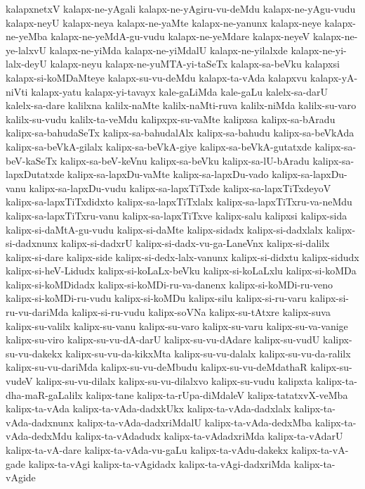 {kalapxnetxV
kalapx-ne-yAgali
kalapx-ne-yAgiru-vu-deMdu
kalapx-ne-yAgu-vudu
kalapx-neyU
kalapx-neya
kalapx-ne-yaMte
kalapx-ne-yanunx
kalapx-neye
kalapx-ne-yeMba
kalapx-ne-yeMdA-gu-vudu
kalapx-ne-yeMdare
kalapx-neyeV
kalapx-ne-ye-lalxvU
kalapx-ne-yiMda
kalapx-ne-yiMdalU
kalapx-ne-yilalxde
kalapx-ne-yi-lalx-deyU
kalapx-neyu
kalapx-ne-yuMTA-yi-taSeTx
kalapx-sa-beVku
kalapxsi
kalapx-si-koMDaMteye
kalapx-su-vu-deMdu
kalapx-ta-vAda
kalapxvu
kalapx-yA-niVti
kalapx-yatu
kalapx-yi-tavayx
kale-gaLiMda
kale-gaLu
kalelx-sa-darU
kalelx-sa-dare
kalilxna
kalilx-naMte
kalilx-naMti-ruva
kalilx-niMda
kalilx-su-varo
kalilx-su-vudu
kalilx-ta-veMdu
kalipxpx-su-vaMte
kalipxsa
kalipx-sa-bAradu
kalipx-sa-bahudaSeTx
kalipx-sa-bahudalAlx
kalipx-sa-bahudu
kalipx-sa-beVkAda
kalipx-sa-beVkA-gilalx
kalipx-sa-beVkA-giye
kalipx-sa-beVkA-gutatxde
kalipx-sa-beV-kaSeTx
kalipx-sa-beV-keVnu
kalipx-sa-beVku
kalipx-sa-lU-bAradu
kalipx-sa-lapxDutatxde
kalipx-sa-lapxDu-vaMte
kalipx-sa-lapxDu-vado
kalipx-sa-lapxDu-vanu
kalipx-sa-lapxDu-vudu
kalipx-sa-lapxTiTxde
kalipx-sa-lapxTiTxdeyoV
kalipx-sa-lapxTiTxdidxto
kalipx-sa-lapxTiTxlalx
kalipx-sa-lapxTiTxru-va-neMdu
kalipx-sa-lapxTiTxru-vanu
kalipx-sa-lapxTiTxve
kalipx-salu
kalipxsi
kalipx-sida
kalipx-si-daMtA-gu-vudu
kalipx-si-daMte
kalipx-sidadx
kalipx-si-dadxlalx
kalipx-si-dadxnunx
kalipx-si-dadxrU
kalipx-si-dadx-vu-ga-LaneVnx
kalipx-si-dalilx
kalipx-si-dare
kalipx-side
kalipx-si-dedx-lalx-vanunx
kalipx-si-didxtu
kalipx-sidudx
kalipx-si-heV-Lidudx
kalipx-si-koLaLx-beVku
kalipx-si-koLaLxlu
kalipx-si-koMDa
kalipx-si-koMDidadx
kalipx-si-koMDi-ru-va-danenx
kalipx-si-koMDi-ru-veno
kalipx-si-koMDi-ru-vudu
kalipx-si-koMDu
kalipx-silu
kalipx-si-ru-varu
kalipx-si-ru-vu-dariMda
kalipx-si-ru-vudu
kalipx-soVNa
kalipx-su-tAtxre
kalipx-suva
kalipx-su-valilx
kalipx-su-vanu
kalipx-su-varo
kalipx-su-varu
kalipx-su-va-vanige
kalipx-su-viro
kalipx-su-vu-dA-darU
kalipx-su-vu-dAdare
kalipx-su-vudU
kalipx-su-vu-dakekx
kalipx-su-vu-da-kikxMta
kalipx-su-vu-dalalx
kalipx-su-vu-da-ralilx
kalipx-su-vu-dariMda
kalipx-su-vu-deMbudu
kalipx-su-vu-deMdathaR
kalipx-su-vudeV
kalipx-su-vu-dilalx
kalipx-su-vu-dilalxvo
kalipx-su-vudu
kalipxta
kalipx-ta-dha-maR-gaLalilx
kalipx-tane
kalipx-ta-rUpa-diMdaleV
kalipx-tatatxvX-veMba
kalipx-ta-vAda
kalipx-ta-vAda-dadxkUkx
kalipx-ta-vAda-dadxlalx
kalipx-ta-vAda-dadxnunx
kalipx-ta-vAda-dadxriMdalU
kalipx-ta-vAda-dedxMba
kalipx-ta-vAda-dedxMdu
kalipx-ta-vAdadudx
kalipx-ta-vAdadxriMda
kalipx-ta-vAdarU
kalipx-ta-vA-dare
kalipx-ta-vAda-vu-gaLu
kalipx-ta-vAdu-dakekx
kalipx-ta-vA-gade
kalipx-ta-vAgi
kalipx-ta-vAgidadx
kalipx-ta-vAgi-dadxriMda
kalipx-ta-vAgide
}
